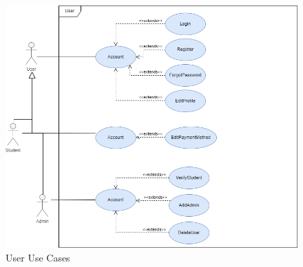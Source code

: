 \documentclass[hidelinks, 12pt, a4paper]{article}
\begin{document}
                    \begin{figure}[H]
                    
                        \centering
                        \includegraphics[width=15cm]{images/User Usecase.drawio.png}
                        \caption{User Use Cases}
                        \label{fig:User UseCases}
                        
                    \end{figure}
            
\end{document}
